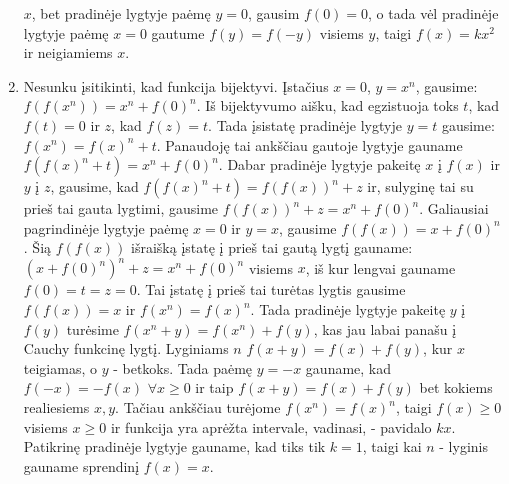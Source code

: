 \begin{enumerate}
    $x$, bet pradinėje lygtyje paėmę $y=0$, gausim $f(0)=0$, o tada vėl
    pradinėje lygtyje paėmę $x=0$ gautume $f(y)=f(-y)$ visiems $y$, taigi
    $f(x)=kx^2$ ir neigiamiems $x$.
\item
    Nesunku įsitikinti, kad funkcija bijektyvi. Įstačius $x=0$, $y=x^n$,
    gausime: $f(f(x^n))=x^n+f(0)^n$. Iš bijektyvumo aišku, kad egzistuoja
    toks $t$, kad  $f(t)=0$ ir $z$, kad  $f(z)=t$. Tada įsistatę pradinėje
    lygtyje $y=t$ gausime: $f(x^n)=f(x)^n+t$. Panaudoję tai
    ankščiau gautoje lygtyje gauname $f(f(x)^n+t)=x^n+f(0)^n$. Dabar pradinėje
    lygtyje pakeitę $x$ į $f(x)$ ir $y$ į $z$, gausime, kad
    $f(f(x)^n+t)=f(f(x))^n+z$ ir, sulyginę tai su prieš tai gauta lygtimi,
    gausime $f(f(x))^n+z=x^n+f(0)^n$. Galiausiai pagrindinėje lygtyje
    paėmę $x=0$ ir $y=x$, gausime $f(f(x))=x+f(0)^n$. Šią $f(f(x))$
    išraišką įstatę į prieš tai gautą lygtį gauname:
    $(x+f(0)^n)^n+z=x^n+f(0)^n$ visiems $x$, iš kur lengvai gauname
    $f(0)=t=z=0$. Tai įstatę į prieš tai turėtas lygtis gausime $f(f(x))=x$
    ir $f(x^n)=f(x)^n$. Tada pradinėje lygtyje pakeitę $y$ į $f(y)$
    turėsime $f(x^n+y)=f(x^n)+f(y)$, kas jau labai panašu į Cauchy
    funkcinę lygtį.  Lyginiams $n$ $f(x+y)=f(x)+f(y)$, kur $x$ teigiamas, o
    $y$ - betkoks. Tada paėmę $y=-x$ gauname, kad $f(-x)=-f(x)$ $ \forall
    x\geq 0$ ir taip $f(x+y)=f(x)+f(y)$ bet kokiems realiesiems $x,y$.
    Tačiau ankščiau turėjome $f(x^n)=f(x)^n$, taigi $f(x)\geq 0$ visiems
    $x\geq 0$ ir funkcija yra aprėžta intervale, vadinasi, - pavidalo $kx$.
    Patikrinę pradinėje lygtyje gauname, kad tiks tik $k=1$, taigi kai $n$
    - lyginis gauname sprendinį $f(x)=x$.
    

\end{enumerate}
